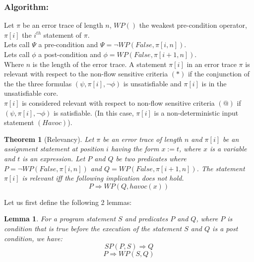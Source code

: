 \documentclass{article}
\newtheorem{theorem}{Theorem}
\newtheorem{lemma}{Lemma}
\begin{document}
\subsubsection{Algorithm:}
Let $\pi$ be an error trace of length $n$, $WP()$ the weakest pre-condition operator, $\pi[i]$ the $i^{th}$ statement of $\pi$.\\
Lets call $\Psi$ a pre-condition and $\Psi = \neg WP(False, \pi[i,n])$.\\
Lets call $\phi$ a post-condition and $\phi =  WP(False, \pi[i+1,n])$.\\
 Where $n$ is the length of the error trace.
A statement $\pi[i]$ in an error trace $\pi$ is relevant with respect to the non-flow sensitive criteria $(*)$ if the conjunction of the the three formulas $(\psi,\pi[i],\neg \phi) $ is unsatisfiable and $\pi[i]$ is in the unsatisfiable core.\\
$\pi[i]$ is considered relevant with respect to non-flow sensitive criteria $(@)$ if  $(\psi,\pi[i],\neg \phi) $ is satisfiable. (In this case, $\pi[i]$ is a non-deterministic input statement $(Havoc)$).\\
\begin{theorem}[Relevancy]
Let $\pi$ be an error trace of length $n$ and $\pi[i]$ be an assignment statement at position $i$ having the form $x:=t$, where $x$ is a variable and $t$ is an expression. Let $P$ and $Q$ be two predicates where $P = \neg WP(False, \pi[i,n])$ and $Q =  WP(False, \pi[i+1,n])$. The statement $\pi[i]$ is relevant iff the following implication does not hold.
 $$P \Rightarrow WP(Q,havoc(x))$$
\end{theorem}
Let us first define the following 2 lemmas: \\
\begin{lemma}
For a program statement $S$ and predicates $P$ and $Q$, where $P$ is condition that is true before the execution of the statement $S$ and $Q$ is a post condition, we have:
$$SP(P,S) \Rightarrow Q$$
$$P \Rightarrow WP(S,Q)$$
\end{lemma}
\end{document}
